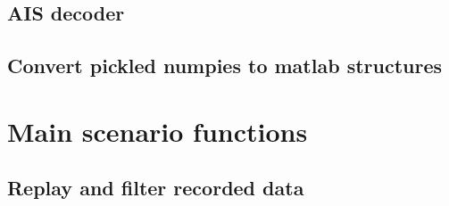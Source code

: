 \subsection{AIS decoder}

\subsection{Convert pickled numpies to matlab structures}


\section{Main scenario functions}
\subsection{Replay and filter recorded data}
